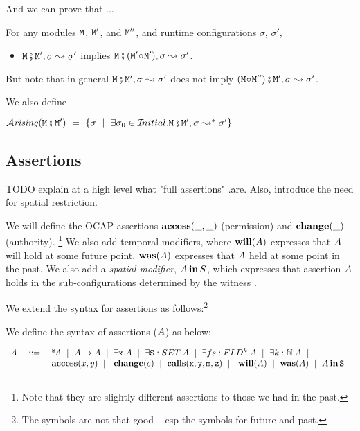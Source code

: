 And we can prove that ...

\begin{lemma}[xxx]
\label{lamma:module_pair_execution} 
For any modules ${\mbox{\tt{M}}}$, ${\mbox{\tt{M}}}'$, and ${\mbox{\tt{M}}}''$, and runtime configurations $\sigma$, $\sigma'$, 

\begin{itemize}
\item
 ${\mbox{\tt{M}}} \fatsemi {\mbox{\tt{M}}}', \sigma \leadsto \sigma'$  implies ${\mbox{\tt{M}}} \fatsemi ({\mbox{\tt{M}}}'\!\circ\!{\mbox{\tt{M}}}') ,\sigma \leadsto \sigma'$.
\end{itemize}
\end{lemma} 

But note that in general ${\mbox{\tt{M}}} \fatsemi {\mbox{\tt{M}}}', \sigma \leadsto \sigma'$  does not imply
$({\mbox{\tt{M}}}\!\circ\!{\mbox{\tt{M}}}'') \fatsemi {\mbox{\tt{M}}}' , \sigma \leadsto \sigma'$.


We also define 
\begin{definition}
$\Arising {\M\mkpair\M'} \ = \ \{ \sigma \ \mid \ \exists \sigma_0 \in \Initial. \M\mkpair\M', \sigma \leadsto^* \sigma' \} $
\end{definition}
 
 \subsection{Assertions}

TODO explain at a high level what "full assertions" .are. Also, introduce the need  for spatial restriction. 

We will define the OCAP assertions $\mbox{\bf{access}}(\_,\_ )$  (permission)
and   $\mbox{\bf{change}}(\_)$ (authority). \footnote{Note that they are slightly different
assertions to those we had in the past.}
We also add temporal modifiers, where $\mbox{\bf{will}}(A)$ expresses that $A$ will hold at some future point,
$\mbox{\bf{was}}(A)$ expresses that $A$ held at some point in the past.
We also add a {\em spatial modifier}, $A\,\mbox{\bf{in}}\, S$, which expresses that assertion $A$ holds in
the sub-configurations determined by the witness .

We extend the syntax for assertions as follows:\footnote{The symbols are not that good -- esp the symbols for future and past.}

\begin{definition}[Assertions]We define the syntax of assertions ($A$) as below:
\label{def:assertions}

$\begin{array}{lcl}
\A &\ ::=\  &  \SA \ \mid  \ \A \rightarrow \A \ \mid \     \exists \prg{x}.\A  \ \mid \  \exists \prg{S}:SET.\A  \ \mid \  \exists fs:FLD^k.\A
 \ \mid \  \exists k:\mathbb{N}.\A  \ \mid \ \\
 & &    \CanAccess x y \ \mid\  \ \Changes e \ \mid\  \Calls{\prg{x},\prg{y},\prg{m},\prg{z}} \ \mid\  \  \Future \A  \ \mid \  \Past \A \ \mid \ \Using \A \prg{S }
\end{array}$
\end{definition} 

